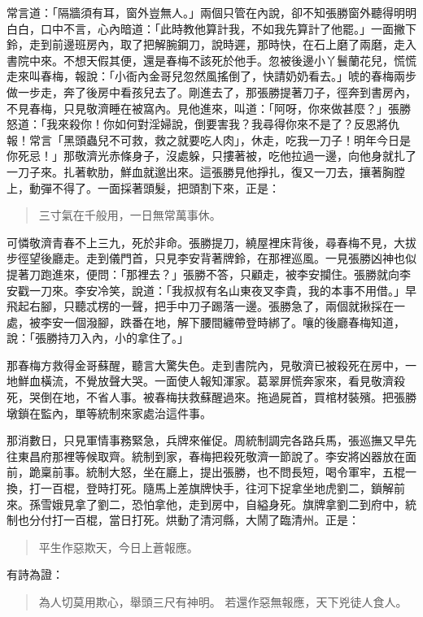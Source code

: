 常言道：「隔牆須有耳，窗外豈無人。」兩個只管在內說，卻不知張勝窗外聽得明明白白，口中不言，心內暗道：「此時教他算計我，不如我先算計了他罷。」一面撇下鈴，走到前邊班房內，取了把解腕鋼刀，說時遲，那時快，在石上磨了兩磨，走入書院中來。不想天假其便，還是春梅不該死於他手。忽被後邊小丫鬟蘭花兒，慌慌走來叫春梅，報說：「小衙內金哥兒忽然風搖倒了，快請奶奶看去。」唬的春梅兩步做一步走，奔了後房中看孩兒去了。剛進去了，那張勝提著刀子，徑奔到書房內，不見春梅，只見敬濟睡在被窩內。見他進來，叫道：「阿呀，你來做甚麼？」張勝怒道：「我來殺你！你如何對淫婦說，倒要害我？我尋得你來不是了？反恩將仇報！常言「黑頭蟲兒不可救，救之就要吃人肉」，休走，吃我一刀子！明年今日是你死忌！」那敬濟光赤條身子，沒處躲，只摟著被，吃他拉過一邊，向他身就扎了一刀子來。扎著軟肋，鮮血就邈出來。這張勝見他掙扎，復又一刀去，攘著胸膛上，動彈不得了。一面採著頭髮，把頭割下來，正是：
\begin{quote}
三寸氣在千般用，一日無常萬事休。
\end{quote}

可憐敬濟青春不上三九，死於非命。張勝提刀，繞屋裡床背後，尋春梅不見，大拔步徑望後廳走。走到儀門首，只見李安背著牌鈴，在那裡巡風。一見張勝凶神也似提著刀跑進來，便問：「那裡去？」張勝不答，只顧走，被李安攔住。張勝就向李安戳一刀來。李安冷笑，說道：「我叔叔有名山東夜叉李貴，我的本事不用借。」早飛起右腳，只聽忒楞的一聲，把手中刀子踢落一邊。張勝急了，兩個就揪採在一處，被李安一個潑腳，跌番在地，解下腰間纏帶登時綁了。嚷的後廳春梅知道，說：「張勝持刀入內，小的拿住了。」

那春梅方救得金哥蘇醒，聽言大驚失色。走到書院內，見敬濟已被殺死在房中，一地鮮血橫流，不覺放聲大哭。一面使人報知渾家。葛翠屏慌奔家來，看見敬濟殺死，哭倒在地，不省人事。被春梅扶救蘇醒過來。拖過屍首，買棺材裝殯。把張勝墩鎖在監內，單等統制來家處治這件事。

那消數日，只見軍情事務緊急，兵牌來催促。周統制調完各路兵馬，張巡撫又早先往東昌府那裡等候取齊。統制到家，春梅把殺死敬濟一節說了。李安將凶器放在面前，跪稟前事。統制大怒，坐在廳上，提出張勝，也不問長短，喝令軍牢，五棍一換，打一百棍，登時打死。隨馬上差旗牌快手，往河下捉拿坐地虎劉二，鎖解前來。孫雪娥見拿了劉二，恐怕拿他，走到房中，自縊身死。旗牌拿劉二到府中，統制也分付打一百棍，當日打死。烘動了清河縣，大鬧了臨清州。正是：
\begin{quote}
平生作惡欺天，今日上蒼報應。
\end{quote}

有詩為證：
\begin{quote}
為人切莫用欺心，舉頭三尺有神明。
若還作惡無報應，天下兇徒人食人。
\end{quote}

